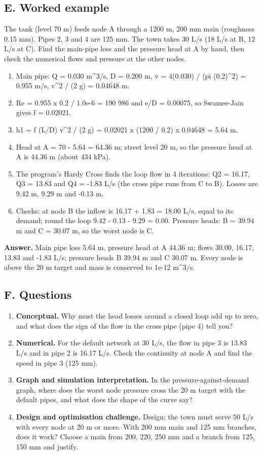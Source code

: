 \documentclass[11pt,a4paper]{article}
\begin{document}
\subsection*{E. Worked example}
The tank (level 70 m) feeds node A through a 1200 m, 200 mm main (roughness 0.15 mm). Pipes 2, 3 and 4 are 125 mm. The town takes 30 L/s (18 L/s at B, 12 L/s at C). Find the main-pipe loss and the pressure head at A by hand, then check the numerical flows and pressure at the other nodes.
\begin{enumerate}[nosep]
\item Main pipe: Q = 0.030 m\textasciicircum{}3/s, D = 0.200 m, v = 4(0.030) / (pi (0.2)\textasciicircum{}2) = 0.955 m/s, v\textasciicircum{}2 / (2 g) = 0.04648 m.
\item Re = 0.955 x 0.2 / 1.0e-6 = 190 986 and e/D = 0.00075, so Swamee-Jain gives f = 0.02021.
\item h1 = f (L/D) v\textasciicircum{}2 / (2 g) = 0.02021 x (1200 / 0.2) x 0.04648 = 5.64 m.
\item Head at A = 70 - 5.64 = 64.36 m; street level 20 m, so the pressure head at A is 44.36 m (about 434 kPa).
\item The program's Hardy Cross finds the loop flow in 4 iterations: Q2 = 16.17, Q3 = 13.83 and Q4 = -1.83 L/s (the cross pipe runs from C to B). Losses are 9.42 m, 9.29 m and -0.13 m.
\item Checks: at node B the inflow is 16.17 + 1.83 = 18.00 L/s, equal to its demand; round the loop 9.42 - 0.13 - 9.29 = 0.00. Pressure heads: B = 39.94 m and C = 30.07 m, so the worst node is C.
\end{enumerate}
\textbf{Answer.} Main pipe loss 5.64 m, pressure head at A 44.36 m; flows 30.00, 16.17, 13.83 and -1.83 L/s; pressure heads B 39.94 m and C 30.07 m. Every node is above the 20 m target and mass is conserved to 1e-12 m\textasciicircum{}3/s.

\subsection*{F. Questions}
\begin{enumerate}[nosep]
\item \textbf{Conceptual.} Why must the head losses around a closed loop add up to zero, and what does the sign of the flow in the cross pipe (pipe 4) tell you?
\item \textbf{Numerical.} For the default network at 30 L/s, the flow in pipe 3 is 13.83 L/s and in pipe 2 is 16.17 L/s. Check the continuity at node A and find the speed in pipe 3 (125 mm).
\item \textbf{Graph and simulation interpretation.} In the pressure-against-demand graph, where does the worst node pressure cross the 20 m target with the default pipes, and what does the shape of the curve say?
\item \textbf{Design and optimisation challenge.} Design: the town must serve 50 L/s with every node at 20 m or more. With 200 mm main and 125 mm branches, does it work? Choose a main from 200, 220, 250 mm and a branch from 125, 150 mm and justify.
\end{enumerate}
\end{document}

